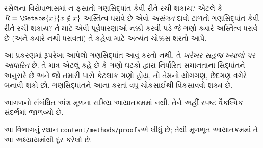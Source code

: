 \begin{digress}
રસેલના વિરોધાભાસમાં ન ફસાતો ગણસિદ્ધાંત કેવી રીતે રચી શકાય?
એટલે કે $R = \Setabs{x}{x \notin x}$ અસ્તિત્વ ધરાવે છે એવો
\emph{અસંગત} દાવો ટાળતો ગણસિદ્ધાંત કેવી રીતે રચી શકાય?
તે માટે એવી પૂર્વધારણાઓ નક્કી કરવી પડે જે ગણો ક્યારે અસ્તિત્વ ધરાવે
છે (અને ક્યારે નથી ધરાવતા) તે કહેવા માટે અત્યંત ચોક્કસ શરતો આપે.

આ પ્રકરણમાં રૂપરેખા આપેલો ગણસિદ્ધાંત આવું કરતો નથી.
તે \emph{ખરેખર સહજ ખ્યાલો પર આધારિત} છે.
તે માત્ર એટલું કહે છે કે ગણો ઘટકો દ્વારા નિર્ધારિત સમાનતાના સિદ્ધાંતને
અનુસરે છે અને જો તમારી પાસે કેટલાક ગણો હોય, તો તેમનો યોગગણ,
છેદગણ વગેરે બનાવી શકો છો.
ગણસિદ્ધાંતને આના કરતાં વધુ ચોકસાઈથી વિકસાવવો શક્ય છે.

\end{digress}
\endgroup


\OLEndChapterHook


\begin{editorial}
આગળનો સંબંધિત અંશ મૂળના સક્રિય આયાતક્રમમાં નથી. તેને અહીં સ્પષ્ટ વૈકલ્પિક સંદર્ભમાં જાળવ્યો છે.
\end{editorial}
\begingroup
\makeatletter{}\makeatother

\label{guunit:OLP-0721}


\begin{editorial}
આ વિભાગનું સ્થાન \verb|content/methods/proofs|એ લીધું છે;
તેથી મૂળભૂત આયાતક્રમમાં તે આ અધ્યાયમાંથી દૂર કરેલો છે.
\end{editorial}

